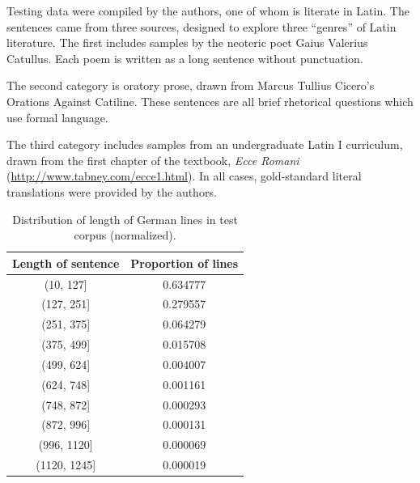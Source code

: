 \documentclass[11pt,a4paper]{article}
\begin{document}
Testing data were compiled by the authors,
one of whom is literate in Latin.
The sentences came from three sources, designed to explore three ``genres'' of Latin literature.
The first includes samples by the neoteric poet Gaius Valerius Catullus.
Each poem is written as a long sentence without punctuation.

The second category is oratory prose, drawn from Marcus Tullius Cicero's Orations Against Catiline.
These sentences are all brief rhetorical questions
which use formal language.

The third category includes samples from an undergraduate Latin I curriculum,
drawn from the first chapter of the textbook, \textit{Ecce Romani} (\href{http://www.tabney.com/ecce1.html}{http://www.tabney.com/ecce1.html}).
In all cases, gold-standard literal translations were provided by the authors.

\begin{table}
        \begin{tabular}{|c | c | } 
        \hline 
        Length of sentence & Proportion of lines \\
        \hline 
        (10, 127]  &  0.634777 \\
        (127, 251]       &          0.279557 \\
        (251, 375]     &            0.064279\\
        (375, 499]    &             0.015708\\
        (499, 624]    &             0.004007\\
        (624, 748]    &             0.001161\\
        (748, 872]    &             0.000293\\
        (872, 996]    &             0.000131\\
        (996, 1120]   &             0.000069\\
        (1120, 1245]  &             0.000019\\
        \hline
    \end{tabular}
    \caption{Distribution of length of German lines in test corpus (normalized).}
    \label{tbl:distde}
\end{table}
\end{document}
